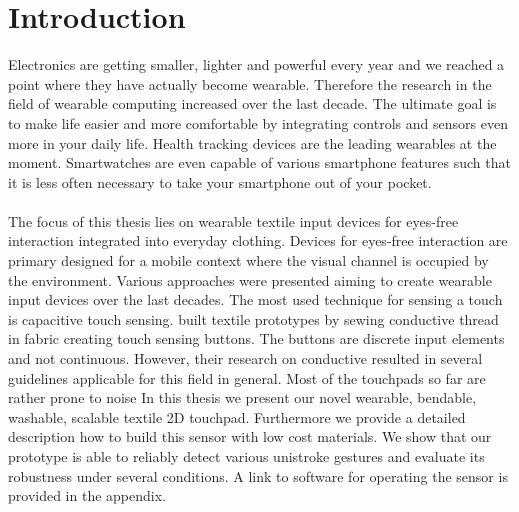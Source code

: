 %

\chapter{Introduction}
\label{introduction}
 
Electronics are getting smaller, lighter and powerful every year and we reached a point where they have actually become wearable. Therefore the research in the field of wearable computing increased over the last decade. The ultimate goal is to make life easier and more comfortable by integrating controls and sensors even more in your daily life. Health tracking devices are the leading wearables at the moment. Smartwatches are even capable of various smartphone features such that it is less often necessary to take your smartphone out of your pocket. \\ \\
The focus of this thesis lies on wearable textile input devices for eyes-free interaction integrated into everyday clothing. Devices for eyes-free interaction are primary designed for a mobile context where the visual channel is occupied by the environment. Various approaches were presented aiming to create wearable input devices over the last decades.
The most used technique for sensing a touch is capacitive touch  sensing. \citep{Holleis:2008:ECT:1409240.1409250} built textile prototypes by sewing conductive thread in fabric creating touch sensing buttons. The buttons are discrete input elements and not continuous. However, their research on conductive resulted in several guidelines applicable for this field in general. 
Most of the touchpads so far are rather prone to noise
In this thesis we present our novel wearable, bendable, washable, scalable textile 2D touchpad. Furthermore we provide a detailed description how to build this sensor with low cost materials. We show that our prototype is able to reliably detect various unistroke gestures and evaluate its robustness under several conditions. A link to software for operating the sensor is provided in the appendix.

